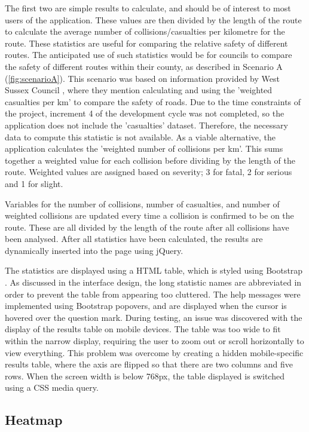 \documentclass[authoryearcitations]{UoYCSproject}
\begin{document}
The first two are simple results to calculate, and should be of interest to most users of the application. These values are then divided by the length of the route to calculate the average number of collisions/casualties per kilometre for the route. These statistics are useful for comparing the relative safety of different routes. The anticipated use of such statistics would be for councils to compare the safety of different routes within their county, as described in Scenario A (\autoref{fig:scenarioA}). This scenario was based on information provided by West Sussex Council \citep{WestSussexCountyCouncil}, where they mention calculating and using the 'weighted casualties per km' to compare the safety of roads. Due to the time constraints of the project, increment 4 of the development cycle was not completed, so the application does not include the 'casualties' dataset. Therefore, the necessary data to compute this statistic is not available. As a viable alternative, the application calculates the 'weighted number of collisions per km'. This sums together a weighted value for each collision before dividing by the length of the route. Weighted values are assigned based on severity; 3 for fatal, 2 for serious and 1 for slight. 

Variables for the number of collisions, number of casualties, and number of weighted collisions are updated every time a collision is confirmed to be on the route. These are all divided by the length of the route after all collisions have been analysed. After all statistics have been calculated, the results are dynamically inserted into the page using jQuery.

The statistics are displayed using a HTML table, which is styled using Bootstrap \citep{Bootstrap}. As discussed in the interface design, the long statistic names are abbreviated in order to prevent the table from appearing too cluttered. The help messages were implemented using Bootstrap popovers, and are displayed when the cursor is hovered over the question mark. During testing, an issue was discovered with the display of the results table on mobile devices. The table was too wide to fit within the narrow display, requiring the user to zoom out or scroll horizontally to view everything. This problem was overcome by creating a hidden mobile-specific results table, where the axis are flipped so that there are two columns and five rows. When the screen width is below 768px, the table displayed is switched using a CSS media query.

\subsection{Heatmap}
\end{document}
